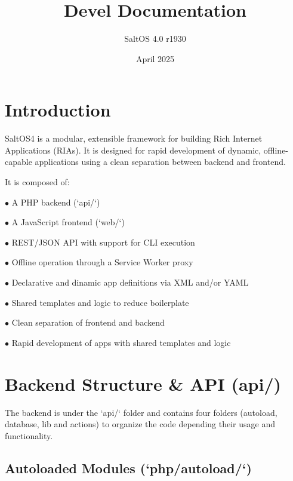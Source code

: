 \documentclass[a4paper]{article}
\title{Devel Documentation}
\author{SaltOS 4.0 r1930}
\begin{document}
\date{April 2025}
\maketitle
\clearpage

\tableofcontents
\clearpage


\hypertarget{toc1}{}
\section{Introduction}

SaltOS4 is a modular, extensible framework for building Rich Internet Applications (RIAs). It is designed for rapid development of dynamic, offline-capable applications using a clean separation between backend and frontend.

It is composed of:

\begin{compactitem}
\item[\color{myblue}$\bullet$] A PHP backend (`api/`)
\item[\color{myblue}$\bullet$] A JavaScript frontend (`web/`)
\item[\color{myblue}$\bullet$] REST/JSON API with support for CLI execution
\item[\color{myblue}$\bullet$] Offline operation through a Service Worker proxy
\item[\color{myblue}$\bullet$] Declarative and dinamic app definitions via XML and/or YAML
\item[\color{myblue}$\bullet$] Shared templates and logic to reduce boilerplate
\item[\color{myblue}$\bullet$] Clean separation of frontend and backend
\item[\color{myblue}$\bullet$] Rapid development of apps with shared templates and logic
\end{compactitem}


\hypertarget{toc2}{}
\section{Backend Structure \& API (api/)}

The backend is under the `api/` folder and contains four folders (autoload, database, lib and actions) to organize the code depending their usage and functionality.

\hypertarget{toc3}{}
\subsection{Autoloaded Modules (`php/autoload/`)}
\end{document}
